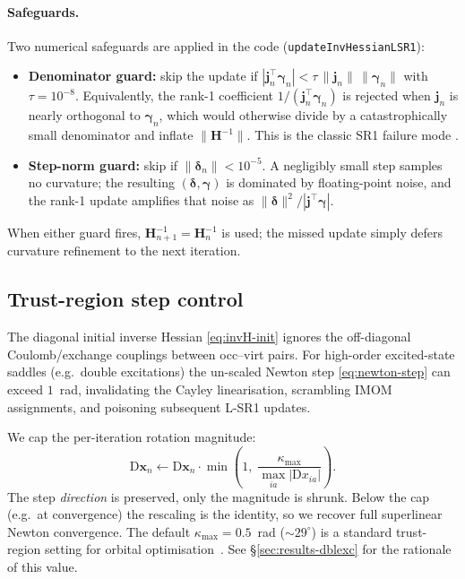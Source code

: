 \documentclass[11pt,a4paper]{article}
\newcommand{\xx}{\mathbf{x}}
\newcommand{\HH}{\mathbf{H}}
\begin{document}
\paragraph{Safeguards.}
Two numerical safeguards are applied in the code
(\texttt{updateInvHessianLSR1}):
\begin{itemize}[leftmargin=*,nosep]
\item \textbf{Denominator guard:} skip the update if
$|\bm{j}_n^{\top}\bm{\gamma}_n| < \tau\,\|\bm{j}_n\|\,\|\bm{\gamma}_n\|$
with $\tau=10^{-8}$. Equivalently, the rank-1 coefficient
$1/(\bm{j}_n^{\top}\bm{\gamma}_n)$ is rejected when $\bm{j}_n$ is
nearly orthogonal to $\bm{\gamma}_n$, which would otherwise divide by a
catastrophically small denominator and inflate $\|\HH^{-1}\|$.
This is the classic SR1 failure mode \cite[\S6.2]{NocedalWright}.
\item \textbf{Step-norm guard:} skip if $\|\bm{\delta}_n\| < 10^{-5}$.
A negligibly small step samples no curvature; the resulting
$(\bm{\delta},\bm{\gamma})$ is dominated by floating-point noise, and
the rank-1 update amplifies that noise as $\|\bm{\delta}\|^2/|\bm{j}^{\top}\bm{\gamma}|$.
\end{itemize}
When either guard fires, $\HH^{-1}_{n+1}=\HH^{-1}_n$ is used; the
missed update simply defers curvature refinement to the next
iteration.

\subsection{Trust-region step control}
\label{sec:trust-region}

The diagonal initial inverse Hessian \eqref{eq:invH-init} ignores the
off-diagonal Coulomb/exchange couplings between occ--virt pairs. For
high-order excited-state saddles (e.g.\ double excitations) the
un-scaled Newton step \eqref{eq:newton-step} can exceed $1$~rad,
invalidating the Cayley linearisation, scrambling IMOM assignments,
and poisoning subsequent L-SR1 updates.

We cap the per-iteration rotation magnitude:
\begin{equation}
\boxed{
\mathrm{D}\xx_n \leftarrow \mathrm{D}\xx_n \cdot
\min\!\left(1,\; \frac{\kappa_\mathrm{max}}{\max_{ia}|\mathrm{D}x_{ia}|}\right).
}
\label{eq:trust-cap}
\end{equation}
The step \emph{direction} is preserved, only the magnitude is
shrunk. Below the cap (e.g.\ at convergence) the rescaling is the
identity, so we recover full superlinear Newton convergence. The
default $\kappa_\mathrm{max}=0.5$~rad
($\sim 29^\circ$) is a standard trust-region setting for orbital
optimisation~\cite{Bacskay1981,HelgakerBook}. See
\S\ref{sec:results-dblexc} for the rationale of this value.
\end{document}
